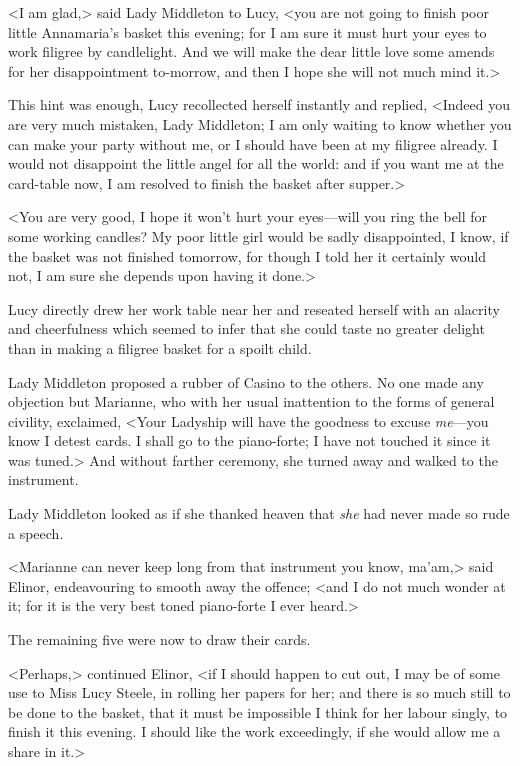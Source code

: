 <I am glad,> said Lady Middleton to Lucy, <you are not going to finish poor little Annamaria's basket this evening; for I am sure it must hurt your eyes to work filigree by candlelight. And we will make the dear little love some amends for her disappointment to-morrow, and then I hope she will not much mind it.>

This hint was enough, Lucy recollected herself instantly and replied, <Indeed you are very much mistaken, Lady Middleton; I am only waiting to know whether you can make your party without me, or I should have been at my filigree already. I would not disappoint the little angel for all the world: and if you want me at the card-table now, I am resolved to finish the basket after supper.>

<You are very good, I hope it won't hurt your eyes—will you ring the bell for some working candles? My poor little girl would be sadly disappointed, I know, if the basket was not finished tomorrow, for though I told her it certainly would not, I am sure she depends upon having it done.>

Lucy directly drew her work table near her and reseated herself with an alacrity and cheerfulness which seemed to infer that she could taste no greater delight than in making a filigree basket for a spoilt child.

Lady Middleton proposed a rubber of Casino to the others. No one made any objection but Marianne, who with her usual inattention to the forms of general civility, exclaimed, <Your Ladyship will have the goodness to excuse \textit{me}—you know I detest cards. I shall go to the piano-forte; I have not touched it since it was tuned.> And without farther ceremony, she turned away and walked to the instrument.

Lady Middleton looked as if she thanked heaven that \textit{she} had never made so rude a speech.

<Marianne can never keep long from that instrument you know, ma'am,> said Elinor, endeavouring to smooth away the offence; <and I do not much wonder at it; for it is the very best toned piano-forte I ever heard.>

The remaining five were now to draw their cards.

<Perhaps,> continued Elinor, <if I should happen to cut out, I may be of some use to Miss Lucy Steele, in rolling her papers for her; and there is so much still to be done to the basket, that it must be impossible I think for her labour singly, to finish it this evening. I should like the work exceedingly, if she would allow me a share in it.>

